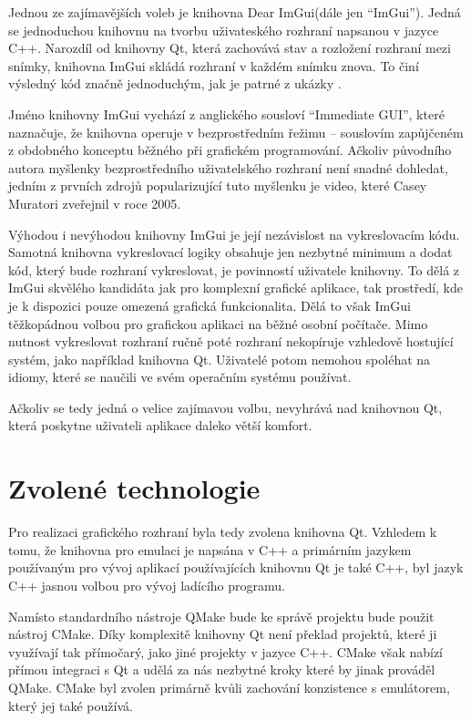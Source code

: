Jednou ze zajímavějších voleb je knihovna Dear ImGui\todocite (dále jen ``ImGui''). Jedná se jednoduchou knihovnu na tvorbu uživateského rozhraní napsanou v jazyce C++. Narozdíl od knihovny Qt, která zachovává stav a rozložení rozhraní mezi snímky, knihovna ImGui skládá rozhraní v každém snímku znova. To činí výsledný kód značně jednoduchým, jak je patrné z ukázky .

Jméno knihovny ImGui vychází z anglického sousloví ``Immediate GUI'', které naznačuje, že knihovna operuje v bezprostředním řežimu -- souslovím zapůjčeném z obdobného konceptu běžného při grafickém programování. Ačkoliv původního autora myšlenky bezprostředního uživatelského rozhraní není snadné dohledat, jedním z prvních zdrojů popularizující tuto myšlenku je video, které Casey Muratori zveřejnil v roce 2005\todocite.


Výhodou i nevýhodou knihovny ImGui je její nezávislost na vykreslovacím kódu. Samotná knihovna vykreslovací logiky obsahuje jen nezbytné minimum a dodat kód, který bude rozhraní vykreslovat, je povinností uživatele knihovny. To dělá z ImGui skvělého kandidáta jak pro komplexní grafické aplikace, tak prostředí, kde je k dispozici pouze omezená grafická funkcionalita. Dělá to však ImGui těžkopádnou volbou pro grafickou aplikaci na běžné osobní počítače. Mimo nutnost vykreslovat rozhraní ručně poté rozhraní nekopíruje vzhledově hostující systém, jako například knihovna Qt. Uživatelé potom nemohou spoléhat na idiomy, které se naučili ve svém operačním systému používat.

Ačkoliv se tedy jedná o velice zajímavou volbu, nevyhrává nad knihovnou Qt, která poskytne uživateli aplikace daleko větší komfort.

\section{Zvolené technologie}

Pro realizaci grafického rozhraní byla tedy zvolena knihovna Qt. Vzhledem k tomu, že knihovna pro emulaci je napsána v C++ a primárním jazykem používaným pro vývoj aplikací používajících knihovnu Qt je také C++, byl jazyk C++ jasnou volbou pro vývoj ladícího programu. 

Namísto standardního nástroje QMake bude ke správě projektu bude použit nástroj CMake. Díky komplexitě knihovny Qt není překlad projektů, které ji využívají tak přímočarý, jako jiné projekty v jazyce C++. CMake však nabízí přímou integraci s Qt a udělá za nás nezbytné kroky které by jinak prováděl QMake. CMake byl zvolen primárně kvůli zachování konzistence s emulátorem, který jej také používá.

